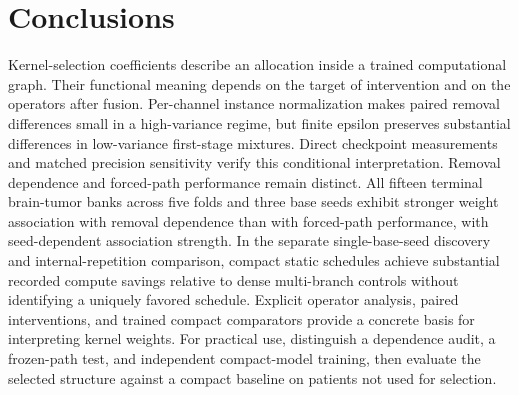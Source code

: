 \documentclass[mathematics,article,submit,pdftex,moreauthors]{Definitions/mdpi}
\begin{document}
\section{Conclusions}
Kernel-selection coefficients describe an allocation inside a trained
computational graph. Their functional meaning depends on the target of
intervention and on the operators after fusion. Per-channel instance
normalization makes paired removal differences small in a high-variance
regime, but finite epsilon preserves substantial differences in low-variance
first-stage mixtures. Direct checkpoint measurements and matched precision
sensitivity verify this conditional interpretation. Removal dependence and
forced-path performance remain distinct.
All fifteen terminal brain-tumor banks across five folds and three base seeds
exhibit stronger weight association with removal dependence than with
forced-path performance, with seed-dependent association strength. In the
separate single-base-seed discovery and internal-repetition comparison,
compact static schedules achieve substantial recorded compute savings
relative to dense multi-branch controls without identifying a uniquely
favored schedule. Explicit operator analysis, paired interventions, and trained
compact comparators provide a concrete basis for interpreting kernel
weights. For practical use, distinguish a dependence audit, a frozen-path
test, and independent compact-model training, then evaluate the selected
structure against a compact baseline on patients not used for selection.
\end{document}
